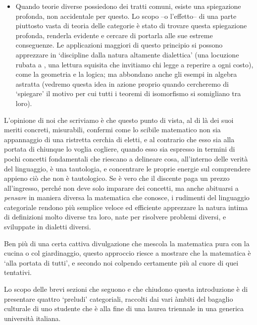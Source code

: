 \begin{itemize}
  \item Quando teorie diverse possiedono dei tratti comuni, esiste una spiegazione profonda, non accidentale per questo. Lo scopo --o l'effetto-- di una parte piuttosto vasta di teoria delle categorie è stato di trovare questa spiegazione profonda, renderla evidente e cercare di portarla alle sue estreme conseguenze. Le applicazioni maggiori di questo principio si possono apprezzare in `discipline dalla natura altamente dialettica' (una locuzione rubata a \cite{lawvere1999profilo}, una lettura squisita che invitiamo chi legge a reperire a ogni costo), come la geometria e la logica; ma abbondano anche gli esempi in algebra astratta (vedremo questa idea in azione proprio quando cercheremo di `spiegare' il motivo per cui tutti i teoremi di isomorfismo si somigliano tra loro).
\end{itemize}
L'opinione di noi che scriviamo è che questo punto di vista, al di là dei suoi meriti concreti, misurabili, confermi come lo scibile matematico non sia appannaggio di una ristretta cerchia di eletti, e al contrario che esso sia alla portata di chiunque lo voglia cogliere, quando esso sia espresso in termini di pochi concetti fondamentali che riescano a delineare cosa, all'interno delle verità del linguaggio, è una tautologia, e concentrare le proprie energie sul comprendere appieno ciò che non è tautologico. Se è vero che il discente paga un prezzo all'ingresso, perché non deve solo imparare dei concetti, ma anche abituarsi a \emph{pensare} in maniera diversa la matematica che conosce, i rudimenti del linguaggio categoriale rendono più semplice veloce ed efficiente apprezzare la natura intima di definizioni molto diverse tra loro, nate per risolvere problemi diversi, e sviluppate in dialetti diversi.

Ben più di una certa cattiva divulgazione che mescola la matematica pura con la cucina o col giardinaggio, questo approccio riesce a mostrare che la matematica è `alla portata di tutti', e secondo noi colpendo certamente più al cuore di quei tentativi.

\medskip
Lo scopo delle brevi sezioni che seguono e che chiudono questa introduzione è di presentare quattro `preludi' categoriali, raccolti dai vari àmbiti del bagaglio culturale di uno studente che è alla fine di una laurea triennale in una generica università italiana.


